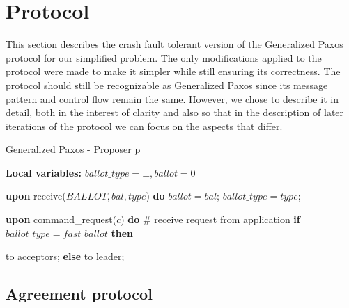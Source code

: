 \section{Protocol} 

This section describes the crash fault tolerant version of the Generalized Paxos protocol for our simplified problem. The only modifications applied to the protocol were made to make it simpler while still ensuring its correctness. The protocol should still be recognizable as Generalized Paxos since its message pattern and control flow remain the same. However, we chose to describe it in detail, both in the interest of clarity and also so that in the description of later iterations of the protocol we can focus on the aspects that differ. 

\begin{algorithm}[h] 
	\caption{Generalized Paxos - Proposer p}
	\textbf{Local variables:} $ballot\_type = \bot, ballot = 0 $
	\begin{algorithmic}[1]
		
		\State \textbf{upon} receive($BALLOT, bal, type$) \textbf{do} 
		\State \hspace{\algorithmicindent} 
		$ballot = bal$;
		\State \hspace{\algorithmicindent} 
		$ballot\_type = type$;
		\State
		
		\State \textbf{upon} command\_request($c$) \textbf{do}   \hspace{\algorithmicindent}\hspace{\algorithmicindent}\hspace{\algorithmicindent}\# receive request from application
		\State \hspace{\algorithmicindent} \textbf{if} $ballot\_type = fast\_ballot$ \textbf{then}
		
		\State \hspace{\algorithmicindent}\hspace{\algorithmicindent}  to acceptors;
		\State \hspace{\algorithmicindent} \textbf{else} 
		\State \hspace{\algorithmicindent}\hspace{\algorithmicindent}  to leader;		
	\end{algorithmic}
\end{algorithm}

\subsection{Agreement protocol} 

